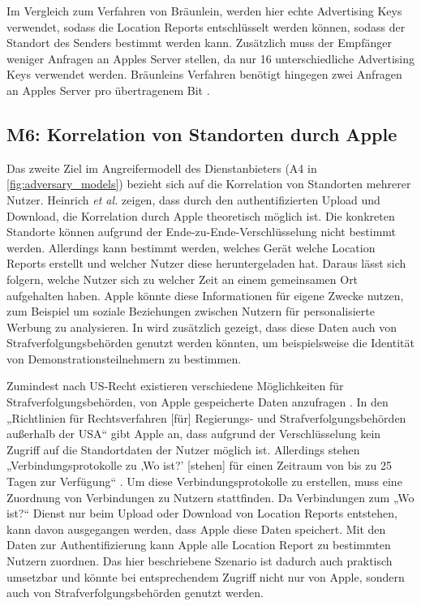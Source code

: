 Im Vergleich zum Verfahren von Bräunlein, werden hier echte Advertising Keys verwendet, sodass die Location Reports entschlüsselt werden können, sodass der Standort des Senders bestimmt werden kann.
Zusätzlich muss der Empfänger weniger Anfragen an Apples Server stellen, da nur 16 unterschiedliche Advertising Keys verwendet werden.
Bräunleins Verfahren benötigt hingegen zwei Anfragen an Apples Server pro übertragenem Bit \cite{braeunlein_sendmy}.


\subsection[M6]{M6: Korrelation von Standorten durch Apple}
\label{missbrauch:6}

Das zweite Ziel im Angreifermodell des Dienstanbieters (A4 in \autoref{fig:adversary_models}) bezieht sich auf die Korrelation von Standorten mehrerer Nutzer.
Heinrich \textit{et al.} \cite{Heinrich_FindMy} zeigen, dass durch den authentifizierten Upload und Download, die Korrelation durch Apple theoretisch möglich ist.
Die konkreten Standorte können aufgrund der Ende-zu-Ende-Verschlüsselung nicht bestimmt werden.
Allerdings kann bestimmt werden, welches Gerät welche Location Reports erstellt und welcher Nutzer diese heruntergeladen hat.
Daraus lässt sich folgern, welche Nutzer sich zu welcher Zeit an einem gemeinsamen Ort aufgehalten haben.
Apple könnte diese Informationen für eigene Zwecke nutzen, zum Beispiel um soziale Beziehungen zwischen Nutzern für personalisierte Werbung zu analysieren.
In \cite{Heinrich_FindMy} wird zusätzlich gezeigt, dass diese Daten auch von Strafverfolgungsbehörden genutzt werden könnten, um beispielsweise die Identität von Demonstrationsteilnehmern zu bestimmen.

Zumindest nach US-Recht existieren verschiedene Möglichkeiten für Strafverfolgungsbehörden, von Apple gespeicherte Daten anzufragen \cite{Data_Access}.
In den „Richtlinien für Rechtsverfahren [für] Regierungs- und Strafverfolgungsbehörden außerhalb der USA“ \cite{Apple_FindMy_Data} gibt Apple an, dass aufgrund der Verschlüsselung kein Zugriff auf die Standortdaten der Nutzer möglich ist.
Allerdings stehen „Verbindungsprotokolle zu ‚Wo ist?’ [stehen] für einen Zeitraum von bis zu 25 Tagen zur Verfügung“ \cite{Apple_FindMy_Data}.
Um diese Verbindungsprotokolle zu erstellen, muss eine Zuordnung von Verbindungen zu Nutzern stattfinden.
Da Verbindungen zum „Wo ist?“ Dienst nur beim Upload oder Download von Location Reports entstehen, kann davon ausgegangen werden, dass Apple diese Daten speichert.
Mit den Daten zur Authentifizierung kann Apple alle Location Report zu bestimmten Nutzern zuordnen.
Das hier beschriebene Szenario ist dadurch auch praktisch umsetzbar und könnte bei entsprechendem Zugriff nicht nur von Apple, sondern auch von Strafverfolgungsbehörden genutzt werden.



